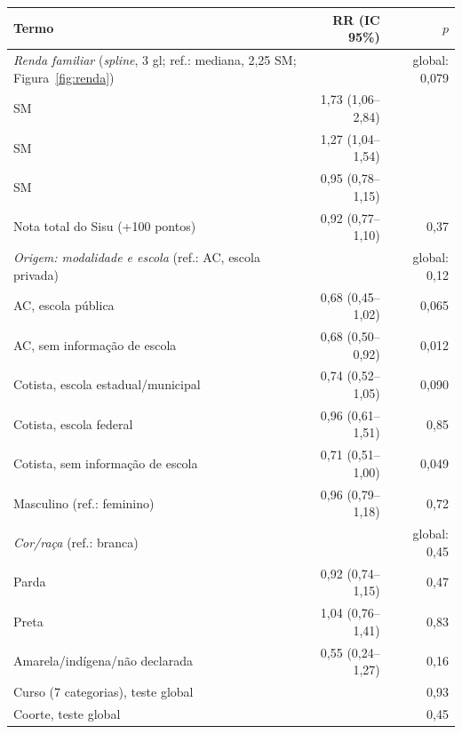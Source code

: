 \begin{tabular}{lrr}
\toprule
Termo & RR (IC 95\%) & $p$ \\
\midrule
\textit{Renda familiar} (\textit{spline}, 3 gl; ref.: mediana, 2,25 SM; Figura~\ref{fig:renda}) &  & global: 0,079 \\
\quad 0 SM & 1,73 (1,06--2,84) &  \\
\quad 1 SM & 1,27 (1,04--1,54) &  \\
\quad 5 SM & 0,95 (0,78--1,15) &  \\
\addlinespace
Nota total do Sisu (+100 pontos) & 0,92 (0,77--1,10) & 0,37 \\
\addlinespace
\textit{Origem: modalidade e escola} (ref.: AC, escola privada) &  & global: 0,12 \\
\quad AC, escola pública & 0,68 (0,45--1,02) & 0,065 \\
\quad AC, sem informação de escola & 0,68 (0,50--0,92) & 0,012 \\
\quad Cotista, escola estadual/municipal & 0,74 (0,52--1,05) & 0,090 \\
\quad Cotista, escola federal & 0,96 (0,61--1,51) & 0,85 \\
\quad Cotista, sem informação de escola & 0,71 (0,51--1,00) & 0,049 \\
\addlinespace
Masculino (ref.: feminino) & 0,96 (0,79--1,18) & 0,72 \\
\addlinespace
\textit{Cor/raça} (ref.: branca) &  & global: 0,45 \\
\quad Parda & 0,92 (0,74--1,15) & 0,47 \\
\quad Preta & 1,04 (0,76--1,41) & 0,83 \\
\quad Amarela/indígena/não declarada & 0,55 (0,24--1,27) & 0,16 \\
\midrule
Curso (7 categorias), teste global &  & 0,93 \\
Coorte, teste global &  & 0,45 \\
\bottomrule
\end{tabular}
